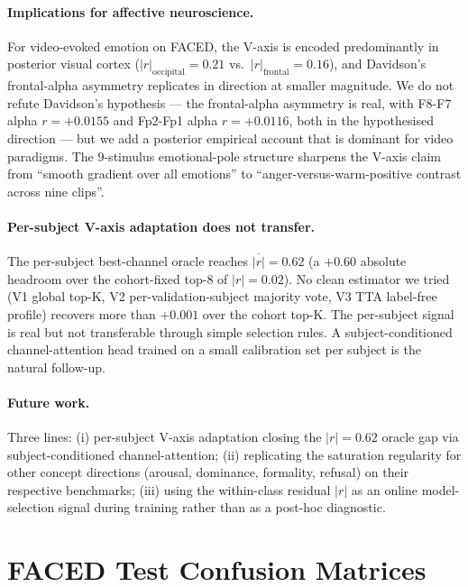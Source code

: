 \paragraph{Implications for affective neuroscience.}
For video-evoked emotion on FACED, the V-axis is encoded predominantly
in posterior visual cortex
($|r|_{\mathrm{occipital}}=0.21$ vs.\ $|r|_{\mathrm{frontal}}=0.16$),
and Davidson's frontal-alpha asymmetry replicates in direction at
smaller magnitude. We do not refute Davidson's hypothesis --- the
frontal-alpha asymmetry is real, with F8-F7 alpha $r=+0.0155$ and
Fp2-Fp1 alpha $r=+0.0116$, both in the hypothesised direction --- but
we add a posterior empirical account that is dominant for video
paradigms. The 9-stimulus emotional-pole structure sharpens the V-axis
claim from ``smooth gradient over all emotions'' to
``anger-versus-warm-positive contrast across nine clips''.

\paragraph{Per-subject V-axis adaptation does not transfer.}
The per-subject best-channel oracle reaches $\overline{|r|}=0.62$
(a $+0.60$ absolute headroom over the cohort-fixed top-8 of
$|r|=0.02$). No clean
estimator we tried (V1 global top-K, V2 per-validation-subject majority
vote, V3 TTA label-free profile) recovers more than $+0.001$ over the
cohort top-K. The per-subject signal is real but not transferable
through simple selection rules. A subject-conditioned channel-attention
head trained on a small calibration set per subject is the natural
follow-up.

\paragraph{Future work.}
Three lines: (i) per-subject V-axis adaptation closing the $|r|=0.62$
oracle gap via subject-conditioned channel-attention; (ii) replicating
the saturation regularity for other concept directions
\citep{arditi2024refusal} (arousal, dominance, formality, refusal) on
their respective benchmarks; (iii) using the within-class residual
$|r|$ as an online model-selection signal during training rather than
as a post-hoc diagnostic.


\section{FACED Test Confusion Matrices}
\label{app:confusion}

